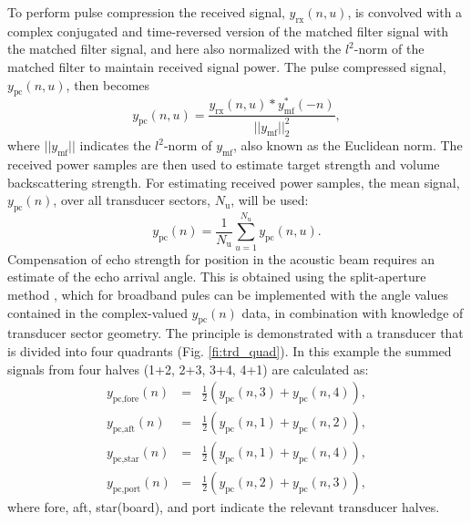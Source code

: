 \documentclass[preprint,12pt,TurnOnLineNumbers]{JASAnew}
\newcommand{\samplesymt}{n}
\newcommand{\channelsym}{u}
\newcommand{\nchannels}{N_{\textrm{u}}}
\newcommand{\yrx}{y_{\textrm{rx}}}
\newcommand{\ymf}{y_{\textrm{mf}}}
\newcommand{\ypc}{y_{\textrm{pc}}}
\begin{document}
To perform pulse compression the received signal, $\yrx(\samplesymt,\channelsym)$, is convolved with a complex conjugated and time-reversed version of the matched filter signal with the matched filter signal, and here also normalized with the $l^2$-norm of the matched filter to maintain received signal power. The pulse compressed signal, $\ypc(\samplesymt,\channelsym)$, then becomes
\begin{equation}
\label{eq:PulseComp}
\ypc(\samplesymt,\channelsym) = \frac{\yrx(\samplesymt,\channelsym)*\ymf^*(-\samplesymt)}{||\ymf||^2_2},
\end{equation}
%
where $||\ymf||$ indicates the $l^2$-norm of $\ymf$, also known as the Euclidean norm. The received power samples are then used to estimate target strength and volume backscattering strength. For estimating received power samples, the mean signal, $\ypc(\samplesymt)$, over all transducer sectors, $\nchannels$, will be used:
%
\begin{equation}
\label{eq:SumSig}
\ypc(\samplesymt) = \frac{1}{\nchannels} \sum_{\channelsym = 1}^{\nchannels} \ypc(\samplesymt,\channelsym).
\end{equation}
%
Compensation of echo strength for position in the acoustic beam requires an estimate of the echo arrival angle. This is obtained using the split-aperture method \citep{burdic1991}, which for broadband pules can be implemented with the angle values contained in the complex-valued $\ypc(\samplesymt)$ data, in combination with knowledge of transducer sector geometry. The principle is demonstrated with a transducer that is divided into four quadrants (Fig. \ref{fi:trd_quad}). In this example the summed signals from four halves (1+2, 2+3, 3+4, 4+1) are calculated as:
\begin{eqnarray}
\label{eq:SumHalves}
y_{\textrm{pc,fore}}(\samplesymt) & = & \frac{1}{2} \left( \ypc(\samplesymt,3)+\ypc(\samplesymt,4) \right),\\
y_{\textrm{pc,aft}}(\samplesymt) & = & \frac{1}{2} \left( \ypc(\samplesymt,1)+\ypc(\samplesymt,2) \right),\\
y_{\textrm{pc,star}}(\samplesymt) & = & \frac{1}{2} \left( \ypc(\samplesymt,1)+\ypc(\samplesymt,4) \right),\\
y_{\textrm{pc,port}}(\samplesymt) & = & \frac{1}{2} \left( \ypc(\samplesymt,2)+\ypc(\samplesymt,3) \right),
\end{eqnarray}
%
where fore, aft, star(board), and port indicate the relevant transducer halves.
\end{document}
